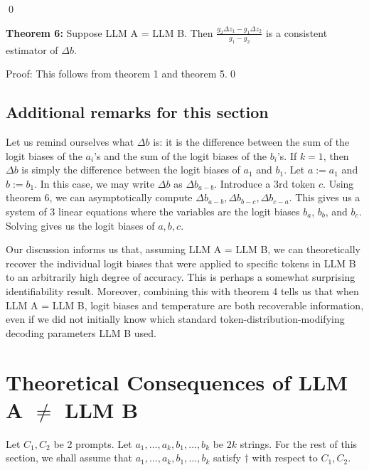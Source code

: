 \documentclass{article}
\begin{document}
\qed 

\textbf{Theorem 6:} Suppose LLM A = LLM B. Then $\displaystyle \frac{g_{2} \Delta z_{1} -g_{1} \Delta z_{2}}{g_{1} -g_{2}}$ is a consistent estimator of $\displaystyle \Delta b$.

Proof: This follows from theorem 1 and theorem 5.\qed 



\subsection{Additional remarks for this section}

Let us remind ourselves what $\displaystyle \Delta b$ is: it is the difference between the sum of the logit biases of the $\displaystyle a_{i}$'s and the sum of the logit biases of the $\displaystyle b_{i}$'s. If $\displaystyle k=1$, then $\displaystyle \Delta b$ is simply the difference between the logit biases of $\displaystyle a_{1}$ and $\displaystyle b_{1}$. Let $\displaystyle a:=a_{1}$ and $\displaystyle b:=b_{1}$. In this case, we may write $\displaystyle \Delta b$ as $\displaystyle \Delta b_{a-b}$. Introduce a 3rd token $\displaystyle c$. Using theorem 6, we can asymptotically compute $\displaystyle \Delta b_{a-b} ,\Delta b_{b-c} ,\Delta b_{c-a}$. This gives us a system of 3 linear equations where the variables are the logit biases $\displaystyle b_{a}$, $\displaystyle b_{b}$, and $\displaystyle b_{c}$. Solving gives us the logit biases of $\displaystyle a,b,c$.



Our discussion informs us that, assuming LLM A = LLM B, we can theoretically recover the individual logit biases that were applied to specific tokens in LLM B to an arbitrarily high degree of accuracy. This is perhaps a somewhat surprising identifiability result. Moreover, combining this with theorem 4 tells us that when LLM A = LLM B, logit biases and temperature are both recoverable information, even if we did not initially know which standard token-distribution-modifying decoding parameters LLM B used.



\section{Theoretical Consequences of LLM A $\neq$ LLM B}
\begin{mdframed}
Let $C_1, C_2$ be 2 prompts. Let $a_1,\ldots,a_k,b_1,\ldots,b_k$ be $2k$ strings.
For the rest of this section, we shall assume that
$a_1,\ldots,a_k,b_1,\ldots,b_k$ satisfy $\dagger$ with respect to $C_1, C_2$.
\end{mdframed}
\end{document}
